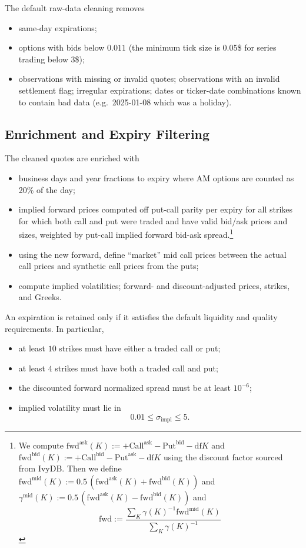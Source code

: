 \documentclass[11pt,a4paper]{article}
\begin{document}
The default raw-data cleaning removes
%
\begin{itemize}
    \item same-day expirations;
    \item options with bids below \(0.011\) (the minimum tick size is 0.05\$ for series trading below 3\$);
    \item observations with missing or invalid quotes; observations with an invalid settlement flag; irregular expirations; dates or ticker-date combinations known to contain bad data (e.g.~2025-01-08 which was a holiday).
\end{itemize}

\subsection{Enrichment and Expiry Filtering}

The cleaned quotes are enriched with
%
\begin{itemize}
    \item business days and year fractions to expiry where AM options are counted as 20\% of
    the day;
    \item implied forward prices computed off put-call parity per expiry for all strikes
          for which both call and put were traded and have valid bid/ask prices and sizes, weighted by put-call implied forward bid-ask spread.\footnote{
            We compute
            $\mathrm{fwd}^\mathrm{ask}(K):=+\mathrm{Call}^\mathrm{ask}-\mathrm{Put}^\mathrm{bid}-\mathrm{df} K$ and
            $\mathrm{fwd}^\mathrm{bid}(K):=+\mathrm{Call}^\mathrm{bid}-\mathrm{Put}^\mathrm{ask}-\mathrm{df} K$ using the discount factor sourced from IvyDB. 
            Then we
            define $\mathrm{fwd}^\mathrm{mid}(K) := 0.5\,(\mathrm{fwd}^\mathrm{ask}(K) + \mathrm{fwd}^\mathrm{bid}(K))$ and $\gamma^\mathrm{mid}(K) := 0.5\,(\mathrm{fwd}^\mathrm{ask}(K) - \mathrm{fwd}^\mathrm{bid}(K))$ and
            $$
                \mathrm{fwd} :=\frac{ \sum_K \gamma(K)^{-1} \mathrm{fwd}^\mathrm{mid}(K) }
                 { \sum_K \gamma(K)^{-1} }
            $$
          }
    \item using the new forward, define ``market'' mid call prices between the actual call
    prices and synthetic call prices from the puts;
    \item compute implied volatilities; forward- and discount-adjusted prices, strikes, and Greeks.
\end{itemize}
An expiration is retained only if it satisfies the default liquidity and quality requirements. In particular,
%
\begin{itemize}
    \item at least \(10\) strikes must have either a traded call or put;
    \item at least \(4\) strikes must have both a traded call and put;
    \item the discounted forward normalized spread must be at least \(10^{-6}\);
    \item implied volatility must lie in
    \[
        0.01 \leq \sigma_{\mathrm{impl}} \leq 5.
    \]
\end{itemize}
\end{document}
